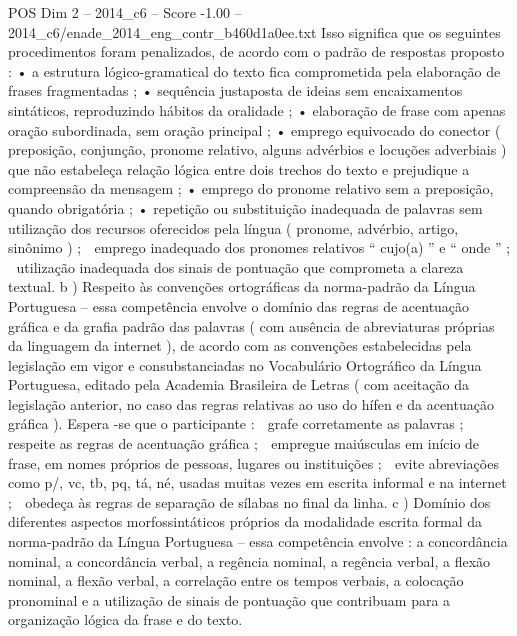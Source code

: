 \begin{textsample}{POS Dim 2 – 2014\_c6 – Score -1.00 – 2014\_c6/enade\_2014\_eng\_contr\_b460d1a0ee.txt}
Isso significa que os seguintes procedimentos foram penalizados, de acordo com o padrão de respostas proposto : • a estrutura lógico-gramatical do texto fica comprometida pela elaboração de frases fragmentadas ; • sequência justaposta de ideias sem encaixamentos sintáticos, reproduzindo hábitos da oralidade ; • elaboração de frase com apenas oração subordinada, sem oração principal ; • emprego equivocado do conector ( preposição, conjunção, pronome relativo, alguns advérbios e locuções adverbiais ) que não estabeleça relação lógica entre dois trechos do texto e prejudique a compreensão da mensagem ; • emprego do pronome relativo sem a preposição, quando obrigatória ; • repetição ou substituição inadequada de palavras sem utilização dos recursos oferecidos pela língua ( pronome, advérbio, artigo, sinônimo ) ;  emprego inadequado dos pronomes relativos “ cujo(a) ” e “ onde ” ;  utilização inadequada dos sinais de pontuação que comprometa a clareza textual. b ) Respeito às convenções ortográficas da norma-padrão da Língua Portuguesa – essa competência envolve o domínio das regras de acentuação gráfica e da grafia padrão das palavras ( com ausência de abreviaturas próprias da linguagem da internet ), de acordo com as convenções estabelecidas pela legislação em vigor e consubstanciadas no Vocabulário Ortográfico da Língua Portuguesa, editado pela Academia Brasileira de Letras ( com aceitação da legislação anterior, no caso das regras relativas ao uso do hífen e da acentuação gráfica ).
Espera -se que o participante :  grafe corretamente as palavras ;  respeite as regras de acentuação gráfica ;  empregue maiúsculas em início de frase, em nomes próprios de pessoas, lugares ou instituições ;  evite abreviações como p/, vc, tb, pq, tá, né, usadas muitas vezes em escrita informal e na internet ;  obedeça às regras de separação de sílabas no final da linha. c ) Domínio dos diferentes aspectos morfossintáticos próprios da modalidade escrita formal da norma-padrão da Língua Portuguesa – essa competência envolve : a concordância nominal, a concordância verbal, a regência nominal, a regência verbal, a flexão nominal, a flexão verbal, a correlação entre os tempos verbais, a colocação pronominal e a utilização de sinais de pontuação que contribuam para a organização lógica da frase e do texto.

\end{textsample}
